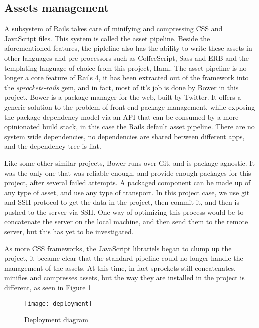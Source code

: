 \subsection{Assets management}
A subsystem of Rails takes care of minifying and compressing CSS and JavaScript
files. This system is called the asset pipeline.
Beside the aforementioned features, the pipleline also has the ability to write
these assets in other languages and pre-processors such as CoffeeScript, Sass
and ERB and the templating language of choice from this project, Haml.
The asset pipeline is no longer a core feature of Rails 4, it has been extracted
out of the framework into the \textit{sprockets-rails} gem, and in fact, most of it's job
is done by Bower in this project.
Bower is a package manager for the web, built by Twitter. It offers a generic
solution to the problem of front-end package management, while exposing the
package dependency model via an API that can be consumed by a more opinionated
build stack, in this case the Rails default asset pipeline. There are no system
wide dependencies, no dependencies are shared between different apps, and the
dependency tree is flat.

Like some other similar projects, Bower runs over Git, and is package-agnostic.
It was the only one that was reliable enough, and provide enough packages for this
project, after several failed attempts. A packaged component can be made up of any type of asset, and
use any type of transport. In this project case, we use git and SSH protocol to get
the data in the project, then commit it, and then is pushed to the server via SSH.
One way of optimizing this process would be to concatenate the server on the local
machine, and then send them to the remote server, but this has yet to be investigated.

As more CSS frameworks, the JavaScript librariels began to clump up
the project, it became clear that the standard pipeline could no longer handle the management of the assets.
At this time, in fact sprockets still concatenates, minifies and compresses assets, but the way they are
installed in the project is different, as seen in Figure \ref{fig:deployment}
\begin{figure}[ht!]
    \centering
    \texttt{[image: deployment]}
    \caption{Deployment diagram}
    \label{fig:deployment}
\end{figure}

